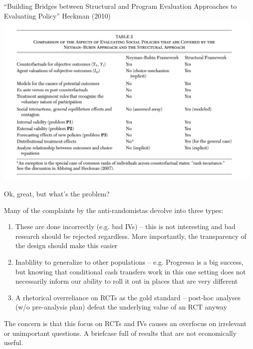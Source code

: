 \documentclass[notes,11pt, aspectratio=169]{beamer}
\newenvironment{wideitemize}{\itemize\addtolength{\itemsep}{10pt}}{\enditemize}
\begin{document}
\begin{frame}{``Building Bridges between Structural and Program Evaluation Approaches to Evaluating Policy'' Heckman (2010)}
  \includegraphics[width=0.75\linewidth]{images/heckman1.jpeg}
\end{frame}



\begin{frame}{Ok, great, but what's the problem?}
  \begin{wideitemize}
  \item Many of the complaints by the anti-randomistas devolve into three types:
    \begin{enumerate}
    \item These are done incorrectly (e.g. bad IVs) -- this is not interesting and bad research should be rejected regardless. More importantly, the transparency of the design should make this easier
    \item Inablility to generalize to other populations --
      e.g. Progressa is a big success, but knowing that conditional
      cash transfers work in this one setting does not necessarily
      inform our ability to roll it out in places that are very
      different
    \item A rhetorical overreliance on RCTs as the gold standard --
      post-hoc analyses (w/o pre-analysis plan) defeat the underlying
      value of an RCT anyway
    \end{enumerate}
  \item The concern is that this focus on RCTs and IVs causes an
    overfocus on irrelevant or unimportant questions.  A briefcase
    full of results that are not economically useful.
  \end{wideitemize}
\end{frame}
\end{document}
